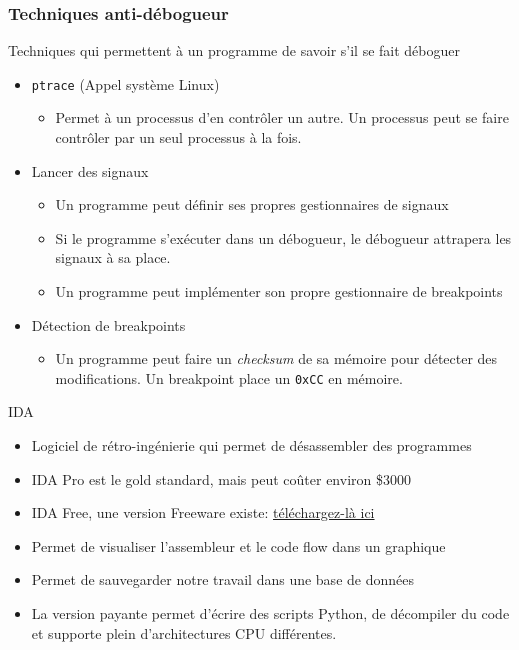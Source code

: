 \documentclass[10pt,xcolor={table,dvipsnames},t]{beamer}
\begin{document}
\begin{frame}
    \frametitle{Techniques anti-débogueur}
    Techniques qui permettent à un programme de savoir s'il se fait déboguer
    
    \begin{itemize}
        \item \texttt{ptrace} (Appel système Linux)
        \begin{itemize}
            \item Permet à un processus d'en contrôler un autre. Un processus peut se faire contrôler par un seul processus à la fois.
        \end{itemize}
        
        \item Lancer des signaux
        \begin{itemize}
            \item Un programme peut définir ses propres gestionnaires de signaux
            \item Si le programme s'exécuter dans un débogueur, le débogueur attrapera les signaux à sa place.
            \item Un programme peut implémenter son propre gestionnaire de breakpoints
        \end{itemize}
        
        \item Détection de breakpoints
        \begin{itemize}
            \item Un programme peut faire un \textit{checksum} de sa mémoire pour détecter des modifications. Un breakpoint place un \texttt{0xCC} en mémoire.
        \end{itemize}
        
    \end{itemize}
\end{frame}





\begin{frame}{IDA}

    \begin{itemize}
        \item Logiciel de rétro-ingénierie qui permet de désassembler des programmes
        \item IDA Pro est le gold standard, mais peut coûter environ \$3000
        \item IDA Free, une version Freeware existe: \href{https://www.hex-rays.com/products/ida/support/download_freeware.shtml}{téléchargez-là ici} 
        \item Permet de visualiser l'assembleur et le code flow dans un graphique
        \item Permet de sauvegarder notre travail dans une base de données
        \item La version payante permet d'écrire des scripts Python, de décompiler du code et supporte plein d'architectures CPU différentes.
    \end{itemize}
\end{frame}
\end{document}
